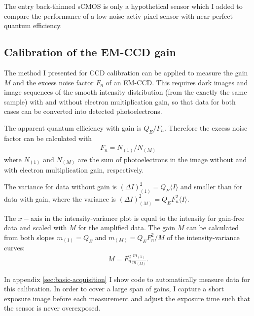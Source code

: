 
The entry back-thinned sCMOS is only a hypothetical sensor which I
added to compare the performance of a low noise activ-pixel sensor
with near perfect quantum efficiency.
\subsection{Calibration of the EM-CCD gain}
The method I presented for CCD calibration can be applied to measure
the gain $M$ and the excess noise factor $F_n$ of an EM-CCD. This
requires dark images and image sequences of the smooth intensity
distribution (from the exactly the same sample) with and without
electron multiplication gain, so that data for both cases can be
converted into detected photoelectrons.

The apparent quantum efficiency with gain is $Q_E/F_n$. Therefore the
excess noise factor can be calculated with
\begin{align}
  F_n =  N_{(1)}/N_{(M)}  
\end{align}
where $N_{(1)}$ and $N_{(M)}$ are the sum of photoelectrons in the
image without and with electron multiplication gain, respectively.

The variance for data without gain is $(\Delta I)^2_{(1)} = Q_E
\langle I \rangle$ and smaller than for data with gain, where the
variance is $(\Delta I)^2_{(M)} = Q_E F_n^2 \langle I \rangle$.

The $x-$axis in the intensity-variance plot is equal to the intensity
for gain-free data and scaled with $M$ for the amplified data.  The
gain $M$ can be calculated from both slopes $m_{(1)}=Q_E$ and $
m_{(M)}=Q_E F_n^2/M$ of the intensity-variance curves:
\begin{align}
  M = F_n^2 \frac{m_{(1)}}{m_{(M)}}.
\end{align}

In appendix \ref{sec:basic-acquisition} I show code to automatically
measure data for this calibration. In order to cover a large span of
gains, I capture a short exposure image before each measurement and
adjust the exposure time such that the sensor is never overexposed.







